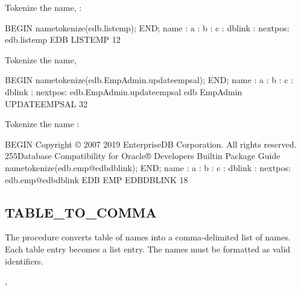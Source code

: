 \documentclass[letterpaper,10pt,english,openany,oneside]{sphinxmanual}
\begin{document}
Tokenize the name,  :

%
\begin{sphinxVerbatim}[commandchars=\\\{\}]
BEGIN
name\PYGZus{}tokenize(\PYGZsq{}edb.list\PYGZus{}emp\PYGZsq{});
END;
name
:
a
:
b
:
c
:
dblink :
nextpos:
edb.list\PYGZus{}emp
EDB
LIST\PYGZus{}EMP
12
\end{sphinxVerbatim}

Tokenize the name, 

%
\begin{sphinxVerbatim}[commandchars=\\\{\}]
BEGIN
name\PYGZus{}tokenize(\PYGZsq{}\PYGZdq{}edb\PYGZdq{}.\PYGZdq{}Emp\PYGZus{}Admin\PYGZdq{}.update\PYGZus{}emp\PYGZus{}sal\PYGZsq{});
END;
name
:
a
:
b
:
c
:
dblink :
nextpos:
\PYGZdq{}edb\PYGZdq{}.\PYGZdq{}Emp\PYGZus{}Admin\PYGZdq{}.update\PYGZus{}emp\PYGZus{}sal
edb
Emp\PYGZus{}Admin
UPDATE\PYGZus{}EMP\PYGZus{}SAL
32
\end{sphinxVerbatim}

\newpage

Tokenize the name  :

%
\begin{sphinxVerbatim}[commandchars=\\\{\}]
BEGIN
Copyright © 2007 \PYGZhy{} 2019 EnterpriseDB Corporation. All rights reserved.
255Database Compatibility for Oracle® Developers
Built\PYGZhy{}in Package Guide
name\PYGZus{}tokenize(\PYGZsq{}edb.emp@edb\PYGZus{}dblink\PYGZsq{});
END;
name
:
a
:
b
:
c
:
dblink :
nextpos:
edb.emp@edb\PYGZus{}dblink
EDB
EMP
EDB\PYGZus{}DBLINK
18
\end{sphinxVerbatim}

\newpage


\subsection{TABLE\_TO\_COMMA}
\label{\detokenize{dbms_utility:table-to-comma}}
The  procedure converts table of names into a
comma-delimited list of names. Each table entry becomes a list entry.
The names must be formatted as valid identifiers.

,
\begin{quote}

\end{quote}
\end{document}
